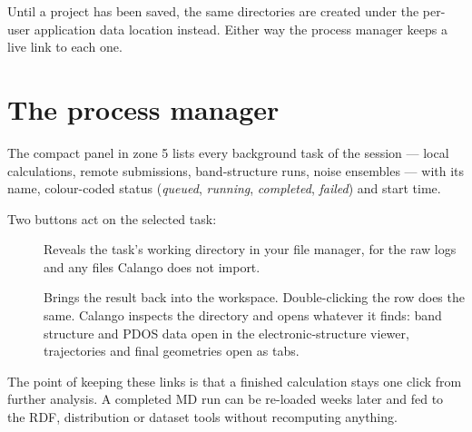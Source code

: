 Until a project has been saved, the same directories are created under the
per-user application data location instead. Either way the process manager
keeps a live link to each one.

\section{The process manager}
\label{sec:process-manager}

The compact  panel in zone 5 lists every background task of
the session --- local calculations, remote submissions, band-structure
runs, noise ensembles --- with its name, colour-coded status
(\emph{queued}, \emph{running}, \emph{completed}, \emph{failed}) and start
time.

Two buttons act on the selected task:

\begin{description}
  \item[] Reveals the task's working directory in your file
    manager, for the raw logs and any files Calango does not import.
  \item[] Brings the result back into the workspace.
    Double-clicking the row does the same. Calango inspects the directory
    and opens whatever it finds: band structure and PDOS data open in the
    electronic-structure viewer, trajectories and final geometries open as
    tabs.
\end{description}

The point of keeping these links is that a finished calculation stays one
click from further analysis. A completed MD run can be re-loaded weeks
later and fed to the RDF, distribution or dataset tools without recomputing
anything.
